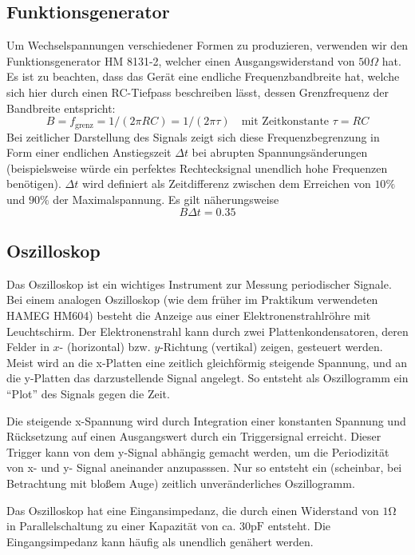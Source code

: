 \documentclass{article}
\begin{document}
\subsection{Funktionsgenerator}
Um Wechselspannungen verschiedener Formen zu produzieren, verwenden wir den Funktionsgenerator HM 8131-2,
welcher einen Ausgangswiderstand von $50\Omega$ hat. Es ist zu beachten, dass das Gerät eine endliche
Frequenzbandbreite hat, welche sich hier durch einen RC-Tiefpass beschreiben lässt, dessen Grenzfrequenz der
Bandbreite entspricht:
\begin{equation}
  B = f_\text{grenz} = 1/(2\pi RC) = 1 / (2\pi \tau) \quad \text{mit Zeitkonstante } \tau = RC
\end{equation}
Bei zeitlicher Darstellung des Signals zeigt sich diese Frequenzbegrenzung in Form einer endlichen Anstiegszeit $\Delta t$ bei abrupten
Spannungsänderungen (beispielsweise würde ein perfektes Rechtecksignal unendlich hohe Frequenzen benötigen). $\Delta t$ wird definiert
als Zeitdifferenz zwischen dem Erreichen von $10 \%$ und $ 90\%$ der Maximalspannung. Es gilt näherungsweise
\begin{equation}
  B \Delta t = 0.35 \label{eq:bdeltat}
\end{equation}

\subsection{Oszilloskop}
Das Oszilloskop ist ein wichtiges Instrument zur Messung periodischer Signale. Bei einem analogen Oszilloskop
(wie dem früher im Praktikum verwendeten HAMEG HM604)
besteht die Anzeige aus einer Elektronenstrahlröhre mit Leuchtschirm. Der Elektronenstrahl kann durch zwei Plattenkondensatoren,
deren Felder in $x$- (horizontal) bzw. $y$-Richtung (vertikal) zeigen, gesteuert werden. Meist wird an die x-Platten
eine zeitlich gleichförmig steigende Spannung, und an die y-Platten das darzustellende Signal angelegt. So entsteht als
Oszillogramm ein \enquote{Plot} des Signals gegen die Zeit.

Die steigende x-Spannung wird durch Integration einer konstanten Spannung
und Rücksetzung auf einen Ausgangswert durch ein Triggersignal erreicht. Dieser Trigger kann von dem y-Signal abhängig
gemacht werden, um die Periodizität von x- und y- Signal aneinander anzupasssen. Nur so entsteht ein
(scheinbar, bei Betrachtung mit bloßem Auge) zeitlich unveränderliches Oszillogramm.

Das Oszilloskop hat eine Eingansimpedanz, die durch einen Widerstand von $1\mathrm{\Omega}$ in Parallelschaltung zu
einer Kapazität von ca. $30\mathrm{pF}$ entsteht. Die Eingangsimpedanz kann häufig als unendlich genähert werden.
\end{document}
